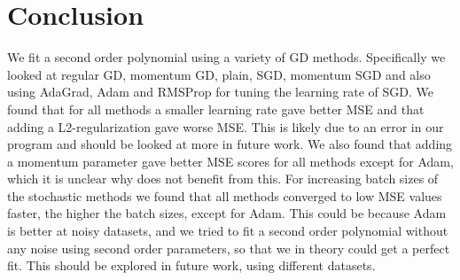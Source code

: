 \section{Conclusion}

We fit a second order polynomial using a variety of GD methods. Specifically we
looked at regular GD, momentum GD, plain, SGD, momentum SGD and also using AdaGrad, Adam 
and RMSProp for tuning the learning rate of SGD. We found that for all methods
a smaller learning rate gave better MSE and that adding a L2-regularization
gave worse MSE. This is likely due to an error in our program and should be
looked at more in future work. We also found that adding a momentum parameter
gave better MSE scores for all methods except for Adam, which it is unclear why
does not benefit from this.
For increasing batch sizes of the stochastic methods we found that all methods
converged to low MSE values faster, the higher the batch sizes, except for
Adam. This could be because Adam is better at noisy datasets, and we tried to
fit a second order polynomial without any noise using second order parameters,
so that we in theory could get a perfect fit. This should be explored in future
work, using different datasets.


\begin{comment}
State your main findings and interpretations. 
Try as far as possible to present perspectives for future work. 
Try to discuss the pros and cons of the methods and possible improvements.
\\~\\
Main findings:

    Neural network (regression):
        Sigmoid: Lambda did not play huge role for big learning rates, but for
        small for smaller the MSE got decreased.
        Relu: Not much impact by lambda. Same with leaky.
        
        Now sklearn: Lambda increased, MSE increase for sigmoid. Not much
        effect for relu.

        Overall we see that learning rate plays huge role. But not lambda, for
        regression.
        
Perspectives for future work:
    Sparse network. 

Pros/Cons of methods and possible improvments:
Was the models used good? What worked and what didn't?
    gradient methods: 
        adam optimizer, not good for not noisy data, slow convergence

    neural network regression:
        We used a dense neural network. This could be made sparse
        
    classification:
        use of sigmoid activation for output in classification. Could be replaced
        by softmax for classifying non-binary problems.

Con/improvement: wrong expression for L2-parameter.
    


\end{comment}

